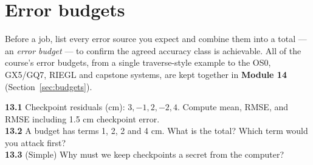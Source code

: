 \section{Error budgets}
Before a job, list every error source you expect and combine them into a total --- an \emph{error budget} --- to confirm the agreed accuracy class is achievable. All of the course's error budgets, from a single traverse-style example to the OS0, GX5/GQ7, RIEGL and capstone systems, are kept together in \textbf{Module 14} (Section~\ref{sec:budgets}).

\begin{tryit}
\textbf{13.1} Checkpoint residuals (cm): $3,-1,2,-2,4$. Compute mean, RMSE, and RMSE including 1.5 cm checkpoint error.\\
\textbf{13.2} A budget has terms 1, 2, 2 and 4 cm. What is the total? Which term would you attack first?\\
\textbf{13.3} (Simple) Why must we keep checkpoints a secret from the computer?
\end{tryit}

